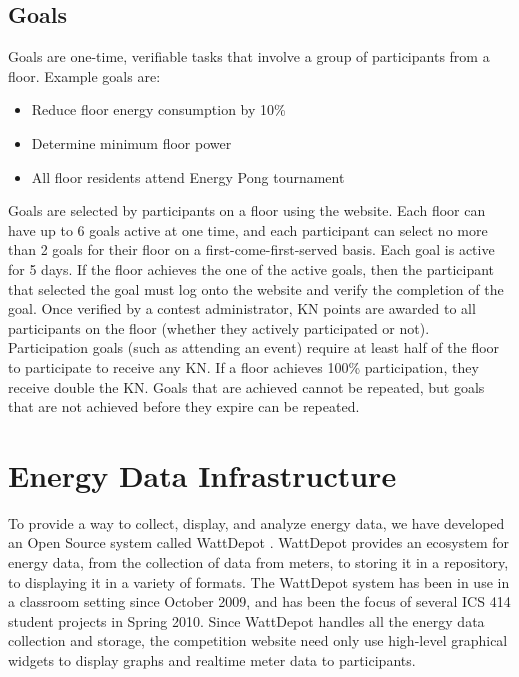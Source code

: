\subsection{Goals}

Goals are one-time, verifiable tasks that involve a group of participants from a floor. Example goals are:

\begin{itemize}
	\item Reduce floor energy consumption by 10\%
	\item Determine minimum floor power
	\item All floor residents attend Energy Pong tournament
\end{itemize}

Goals are selected by participants on a floor using the website. Each floor can have up to 6 goals active at one time, and each participant can select no more than 2 goals for their floor on a first-come-first-served basis. Each goal is active for 5 days. If the floor achieves the one of the active goals, then the participant that selected the goal must log onto the website and verify the completion of the goal. Once verified by a contest administrator, KN points are awarded to all participants on the floor (whether they actively participated or not). Participation goals (such as attending an event) require at least half of the floor to participate to receive any KN. If a floor achieves 100\% participation, they receive double the KN. Goals that are achieved cannot be repeated, but goals that are not achieved before they expire can be repeated.


\section{Energy Data Infrastructure}

To provide a way to collect, display, and analyze energy data, we have developed an Open Source system called WattDepot \cite{WattDepot}. WattDepot provides an ecosystem for energy data, from the collection of data from meters, to storing it in a repository, to displaying it in a variety of formats. The WattDepot system has been in use in a classroom setting since October 2009, and has been the focus of several ICS 414 student projects in Spring 2010. Since WattDepot handles all the energy data collection and storage, the competition website need only use high-level graphical widgets to display graphs and realtime meter data to participants.



